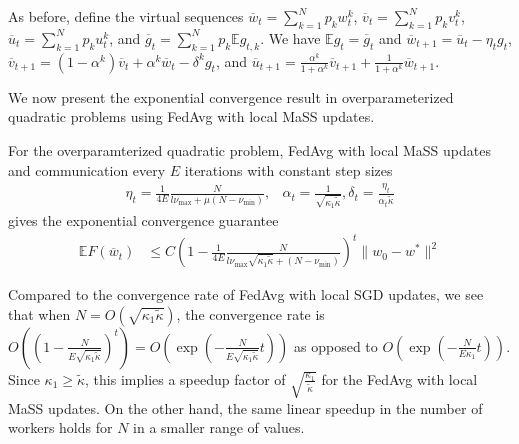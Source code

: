 As before, define the virtual sequences $\overline{w}_{t}=\sum_{k=1}^{N}p_{k}w_{t}^{k}$,
$\overline{v}_{t}=\sum_{k=1}^{N}p_{k}v_{t}^{k}$, $\overline{u}_{t}=\sum_{k=1}^{N}p_{k}u_{t}^{k}$,
and $\overline{g}_{t}=\sum_{k=1}^{N}p_{k}\mathbb{E}g_{t,k}$. We have
$\mathbb{E}g_{t}=\overline{g}_{t}$ and $\overline{w}_{t+1}=\overline{u}_{t}-\eta_{t}g_{t}$,
$\overline{v}_{t+1}=(1-\alpha^{k})\overline{v}_{t}+\alpha^{k}\overline{w}_{t}-\delta^{k}g_{t}$,
and $\overline{u}_{t+1}=\frac{\alpha^{k}}{1+\alpha^{k}}\overline{v}_{t+1}+\frac{1}{1+\alpha^{k}}\overline{w}_{t+1}$. 

We now present the exponential convergence result in overparameterized
quadratic problems using FedAvg with local MaSS updates. 
\begin{theorem}
For the overparamterized quadratic problem, FedAvg with local MaSS
updates and communication every $E$ iterations with constant step
sizes 
\begin{align*}
\eta_{t}=\frac{1}{4E}\frac{N}{l\nu_{\max}+\mu(N-\nu_{\min})}, & \alpha_{t}=\frac{1}{\sqrt{\kappa_{1}\tilde{\kappa}}},\delta_{t}=\frac{\eta_{t}}{\alpha_{t}\tilde{\kappa}}
\end{align*}
gives the exponential convergence guarantee 
\begin{align*}
\mathbb{E}F(\overline{w}_{t}) & \leq C(1-\frac{1}{4E}\frac{N}{l\nu_{\max}\sqrt{\kappa_{1}\tilde{\kappa}}+(N-\nu_{\min})})^{t}\|w_{0}-w^{\ast}\|^{2}
\end{align*}
\end{theorem}
Compared to the convergence rate of FedAvg with local SGD updates,
we see that when $N=O(\sqrt{\kappa_{1}\tilde{\kappa}})$, the convergence
rate is $O((1-\frac{N}{E\sqrt{\kappa_{1}\tilde{\kappa}}})^{t})=O(\exp(-\frac{N}{E\sqrt{\kappa_{1}\tilde{\kappa}}}t))$
as opposed to $O(\exp(-\frac{N}{E\kappa_{1}}t))$. Since $\kappa_{1}\geq\tilde{\kappa}$,
this implies a speedup factor of $\sqrt{\frac{\kappa_{1}}{\tilde{\kappa}}}$
for the FedAvg with local MaSS updates. On the other hand, the same
linear speedup in the number of workers holds for $N$ in a smaller
range of values. 
